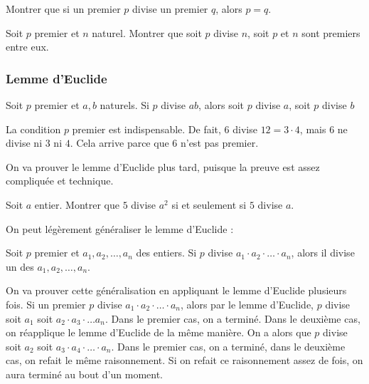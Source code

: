 \begin{exo}
Montrer que si un premier $p$ divise un premier $q$, alors $p=q$.
\end{exo}


\begin{exo}
Soit $p$ premier et $n$ naturel. Montrer que soit $p$ divise $n$, soit $p$ et $n$ sont premiers entre eux.
\end{exo}


\subsubsection{Lemme d'Euclide}


\begin{lem}
Soit $p$ premier et $a, b$ naturels. Si $p$ divise $ab$, alors soit $p$ divise $a$, soit $p$ divise $b$
\end{lem}

\begin{rem}
La condition $p$ premier est indispensable. De fait, $6$ divise $12 = 3 \cdot 4$, mais $6$ ne divise ni $3$ ni $4$. Cela arrive parce que $6$ n'est pas premier.
\end{rem}

On va prouver le lemme d'Euclide plus tard, puisque la preuve est assez compliquée et technique.


\begin{exo}
Soit $a$ entier.
Montrer que $5$ divise $a^2$ si et seulement si $5$ divise $a$.
\end{exo}


On peut légèrement généraliser le lemme d'Euclide :

\begin{thm}
Soit $p$ premier et $a_1, a_2, \dots, a_n$ des entiers. Si $p$ divise $a_1 \cdot a_2 \cdot \dots \cdot a_n$, alors il divise un des $a_1, a_2, \dots, a_n$.
\end{thm}

\begin{preuve}
On va prouver cette généralisation en appliquant le lemme d'Euclide plusieurs fois.
Si un premier $p$ divise $a_1 \cdot a_2 \cdot \dots \cdot a_n$, alors par le lemme d'Euclide, $p$ divise soit $a_1$ soit $a_2 \cdot a_3 \cdot \dots a_n$. Dans le premier cas, on a terminé. Dans le deuxième cas, on réapplique le lemme d'Euclide de la même manière. On a alors que $p$ divise soit $a_2$ soit $a_3 \cdot a_4 \cdot \dots \cdot a_n$. Dans le premier cas, on a terminé, dans le deuxième cas, on refait le même raisonnement. Si on refait ce raisonnement assez de fois, on aura terminé au bout d'un moment.
\end{preuve}

